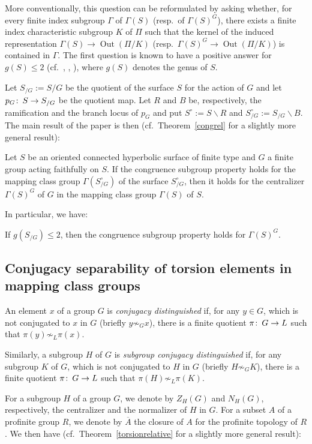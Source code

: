 \documentclass[12pt,twoside]{amsart}
\newenvironment{customtheorem}[1]
  {\renewcommand\theinnercustomthm{#1}\innercustomthm}
  {\endinnercustomthm}
\newenvironment{customcorollary}[1]
  {\renewcommand\theinnercustomcor{#1}\innercustomcor}
  {\endinnercustomcor}
\theoremstyle{definition}
\def\Out{\operatorname{Out}}
\def\G{{\Gamma}}
\def\ssm{\smallsetminus}
\def\ol{\overline}
\def\co{\colon\thinspace}
\begin{document}
More conventionally, this question can be reformulated by asking whether, for every finite index subgroup 
$\G$ of $\G(S)$ (resp.\ of $\G(S)^G$), there exists a finite index characteristic subgroup $K$ of $\Pi$ such that 
the kernel of the induced representation $\G(S)\to\Out(\Pi/K)$ (resp.\ $\G(S)^G\to\Out(\Pi/K)$) is contained in $\G$.
The first question is known to have a positive
answer for $g(S)\leq 2$ (cf.\ \cite{Asada}, \cite{hyp}, \cite{CongTop}), where $g(S)$ denotes the genus of $S$. 

Let $S_{/G}:=S/G$ be the quotient of the surface $S$ for the action of $G$ and let $p_G\co S\to S_{/G}$ be the quotient map. 
Let $R$ and $B$ be, respectively, the ramification and the branch locus of $p_G$ and put $S^\circ:=S\ssm R$ and $S_{/G}^\circ:=S_{/G}\ssm B$.
The main result of the paper is then (cf.\ Theorem~\ref{congrel} for a slightly more general result):

\begin{customtheorem}{A}Let $S$ be an oriented connected hyperbolic surface of finite type and $G$ a finite group acting faithfully on $S$.
If the congruence subgroup property holds for the mapping class group $\G(S_{/G}^\circ)$ of the surface $S_{/G}^\circ$, then it holds for 
the centralizer $\G(S)^G$ of $G$ in the mapping class group $\G(S)$ of $S$.
\end{customtheorem}

In particular, we have:

\begin{customcorollary}{B}If $g(S_{/G})\leq 2$, then the congruence subgroup property holds for $\G(S)^G$.
\end{customcorollary}


\subsection{Conjugacy separability of torsion elements in mapping class groups}
An element $x$ of a group $G$ is \emph{conjugacy distinguished} if, for any $y\in G$, which is not conjugated to $x$ in $G$ 
(briefly $y\not\sim_G x$), there is a finite quotient $\pi\co G\to L$ such that $\pi(y)\not\sim_L \pi(x)$. 

Similarly, a subgroup $H$ of $G$ is \emph{subgroup conjugacy distinguished} if, for any subgroup $K$ of $G$, 
which is not conjugated to $H$ in $G$ (briefly $H\not\sim_G K$), there is a finite quotient $\pi\co G\to L$ such that $\pi(H)\not\sim_L \pi(K)$.

For a subgroup $H$ of a group $G$, we denote by $Z_H(G)$ and $N_H(G)$, respectively, the centralizer and the normalizer of $H$ in $G$. 
For a subset $A$ of a profinite group $R$, we denote by $\ol{A}$ the closure of $A$ for the profinite topology of $R$. We then have
(cf.\ Theorem~\ref{torsionrelative} for a slightly more general result):
\end{document}
